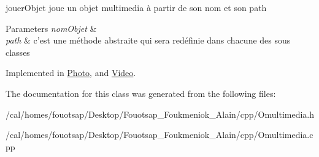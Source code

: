 jouer\+Objet joue un objet multimedia à partir de son nom et son path 


\begin{DoxyParams}{Parameters}
{\em nom\+Objet} & \\
\hline
{\em path} & c'est une méthode abstraite qui sera redéfinie dans chacune des sous classes \\
\hline
\end{DoxyParams}


Implemented in \hyperlink{class_photo_a5b9e3f3f830c4fd02f930fee9dc8dfb2}{Photo}, and \hyperlink{class_video_a62e160d1dc506f032841f2763c8e9377}{Video}.



The documentation for this class was generated from the following files\+:\begin{DoxyCompactItemize}
\item 
/cal/homes/fouotsap/\+Desktop/\+Fouotsap\+\_\+\+Foukmeniok\+\_\+\+Alain/cpp/Omultimedia.\+h\item 
/cal/homes/fouotsap/\+Desktop/\+Fouotsap\+\_\+\+Foukmeniok\+\_\+\+Alain/cpp/Omultimedia.\+cpp\end{DoxyCompactItemize}
